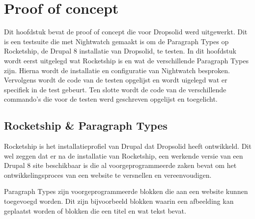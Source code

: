 \chapter{Proof of concept}
\label{ch:proofofconcept}
Dit hoofdstuk bevat de proof of concept die voor Dropsolid werd uitgewerkt. Dit is een \gls{testsuite} die met Nightwatch gemaakt is om de \gls{Paragraph Types} op Rocketship, de Drupal 8 installatie van Dropsolid, te testen. In dit hoofdstuk wordt eerst uitgelegd wat Rocketship is en wat de verschillende \gls{Paragraph Types} zijn. Hierna wordt de installatie en configuratie van Nightwatch besproken. Vervolgens wordt de code van de testen opgelijst en wordt uigelegd wat er specifiek in de test gebeurt. Ten slotte wordt de code van de verschillende commando's die voor de testen werd geschreven opgelijst en toegelicht.

\clearpage
\section{Rocketship \& Paragraph Types}
Rocketship is het installatieprofiel van Drupal dat Dropsolid heeft ontwikkeld. Dit wel zeggen dat er na de installatie van Rocketship, een werkende versie van een Drupal 8 site beschikbaar is die al voorgeprogrammeerde zaken bevat om het ontwikkelingsproces van een website te versnellen en vereenvoudigen.

\gls{Paragraph Types} zijn voorgeprogrammeerde blokken die aan een website kunnen toegevoegd worden. Dit zijn bijvoorbeeld blokken waarin een afbeelding kan geplaatst worden of blokken die een titel en wat tekst bevat.

\clearpage

